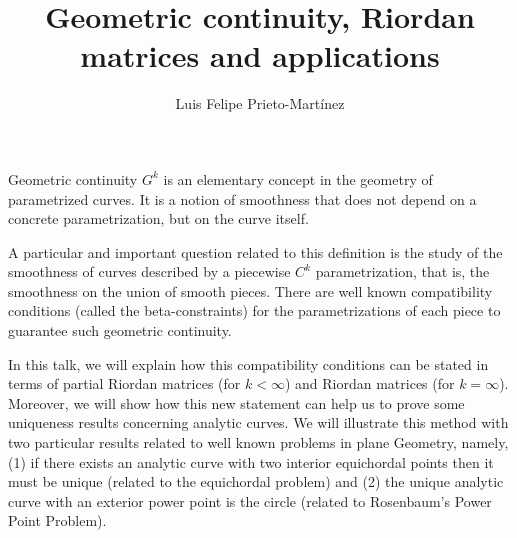 \documentclass[a4paper]{amsart}
\date{}
\begin{document}
\title{Geometric continuity, Riordan matrices and applications}
\author{Luis Felipe Prieto-Mart\'inez} %
\address{Universidad Polit\'ecnica de Madrid} %

\maketitle









Geometric continuity $G^k$ is an elementary concept in the geometry of parametrized curves. It is a notion of smoothness that does not depend on a concrete parametrization, but on the curve itself. 

A particular and important question related to this definition is the study of the smoothness of curves described by a piecewise $C^k$ parametrization, that is, the smoothness on the union of  smooth pieces. There are well known compatibility conditions (called the beta-constraints) for the parametrizations of each piece to guarantee such geometric continuity.

In this talk, we will explain how this compatibility conditions can be stated in terms of partial Riordan matrices (for $k<\infty$) and  Riordan matrices (for $k=\infty$). Moreover, we will show how this new statement can help us to prove some uniqueness results concerning analytic curves. We will illustrate this method with two particular results related to well known problems in plane Geometry, namely, (1) if there exists an analytic curve with two interior equichordal points then it must be unique (related to the equichordal problem) and (2) the unique analytic curve with an exterior power point is the circle (related to  Rosenbaum's Power Point Problem).
\end{document}
